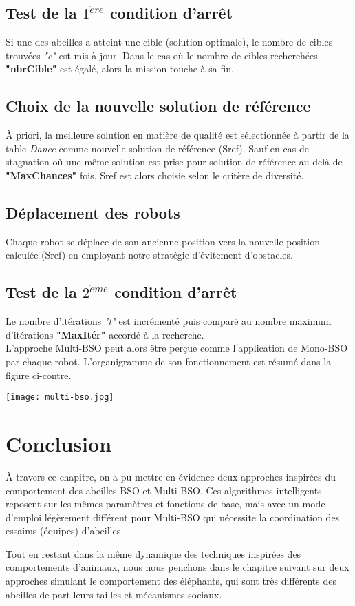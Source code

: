\subsection{Test de la $1^{\grave{e}re}$ condition d'arrêt}
Si une des abeilles a atteint une cible (solution optimale), le nombre de cibles trouvées \textit{"c"} est mis à jour. 
Dans le cas où le nombre de cibles recherchées \textbf{"nbrCible"} est égalé, alors la mission touche à sa fin.

\subsection{Choix de la nouvelle solution de référence}
À priori, la meilleure solution en matière de qualité est sélectionnée à partir de la table \textit{Dance} comme nouvelle solution de référence (Sref).
Sauf en cas de stagnation où une même solution est prise pour solution de référence au-delà de \textbf{"MaxChances"} fois, Sref est alors choisie selon le critère de diversité.


\subsection{Déplacement des robots}
Chaque robot se déplace de son ancienne position vers la nouvelle position calculée (Sref) en employant notre stratégie d'évitement d'obstacles.


\subsection{Test de la $2^{\grave{e}me}$ condition d'arrêt}
Le nombre d'itérations \textit{"t"} est incrémenté puis comparé au nombre maximum d'itérations \textbf{"MaxItér"} accordé à la recherche.\\



L'approche Multi-BSO peut alors être perçue comme l'application de Mono-BSO par chaque robot. L'organigramme de son fonctionnement est résumé dans la figure ci-contre.
\noindent
\begin{center}	  
	\captionsetup{width=1\linewidth}
	\texttt{[image: multi-bso.jpg]}%
	\vspace{-0.3cm}
	\label{multiBSO}%
\end{center}


\section{Conclusion}
À travers ce chapitre, on a pu mettre en évidence deux approches inspirées du comportement des abeilles BSO et Multi-BSO. Ces algorithmes intelligents reposent sur les mêmes paramètres et fonctions de base, mais avec un mode d'emploi légèrement différent pour Multi-BSO qui nécessite la coordination des essaims (équipes) d'abeilles.

Tout en restant dans la même dynamique des techniques inspirées des comportements d'animaux, nous nous penchons dans le chapitre suivant sur deux approches simulant le comportement des éléphants, qui sont très différents des abeilles de part leurs tailles et mécanismes sociaux.






